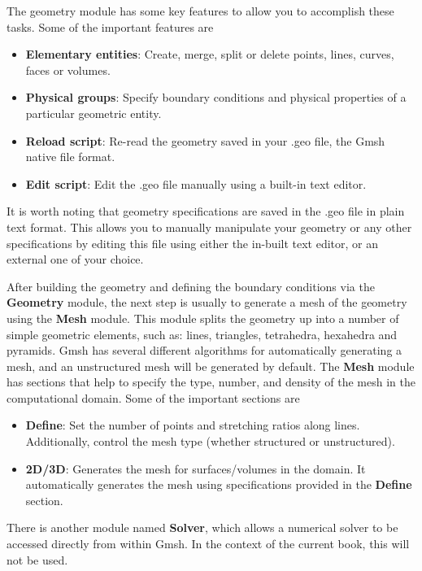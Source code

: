 The geometry module has some key features to allow you to accomplish these tasks. Some of the important features are
\begin{itemize}
    \item \textbf{Elementary entities}: Create, merge, split or delete points, lines, curves, faces or volumes.
    \item \textbf{Physical groups}: Specify boundary conditions and physical properties of a particular geometric entity.
    \item \textbf{Reload script}: Re-read the geometry saved in your .geo file, the Gmsh native file format.
    \item \textbf{Edit script}: Edit the .geo file manually using a built-in text editor.
\end{itemize}
It is worth noting that geometry specifications are saved in the .geo file in plain text format. This allows you to manually manipulate your geometry or any other specifications by editing this file using either the in-built text editor, or an external one of your choice. 

After building the geometry and defining the boundary conditions via the \textbf{Geometry} module, the next step is usually to generate a mesh of the geometry using the \textbf{Mesh} module. This module splits the geometry up into a number of simple geometric elements, such as: lines, triangles, tetrahedra, hexahedra and pyramids. Gmsh has several different algorithms for automatically generating a mesh, and an unstructured mesh will be generated by default. The \textbf{Mesh} module has sections that help to specify the type, number, and density of the mesh in the computational domain. Some of the important sections are
\begin{itemize}
    \item \textbf{Define}: Set the number of points and stretching ratios along lines. Additionally, control the mesh type (whether structured or unstructured).
    \item \textbf{2D/3D}: Generates the mesh for surfaces/volumes in the domain. It automatically generates the mesh using specifications provided in the \textbf{Define} section.
\end{itemize}
There is another module named \textbf{Solver}, which allows a numerical solver to be accessed directly from within Gmsh. In the context of the current book, this will not be used.

